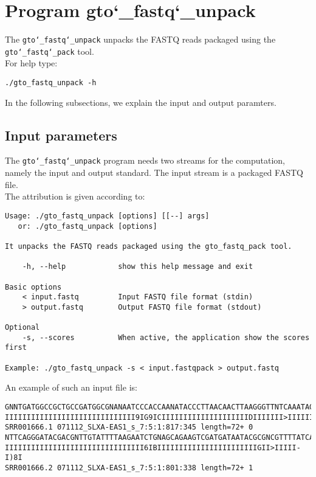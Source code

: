 \section{Program gto\char`_fastq\char`_unpack}
The \texttt{gto\char`_fastq\char`_unpack} unpacks the FASTQ reads packaged using the \texttt{gto\char`_fastq\char`_pack} tool.\\
For help type:
\begin{lstlisting}
./gto_fastq_unpack -h
\end{lstlisting}
In the following subsections, we explain the input and output paramters.

\subsection*{Input parameters}

The \texttt{gto\char`_fastq\char`_unpack} program needs two streams for the computation, namely the input and output standard. The input stream is a packaged FASTQ file.\\
The attribution is given according to:
\begin{lstlisting}
Usage: ./gto_fastq_unpack [options] [[--] args]
   or: ./gto_fastq_unpack [options]

It unpacks the FASTQ reads packaged using the gto_fastq_pack tool.

    -h, --help            show this help message and exit

Basic options
    < input.fastq         Input FASTQ file format (stdin)
    > output.fastq        Output FASTQ file format (stdout)

Optional
    -s, --scores          When active, the application show the scores first
    
Example: ./gto_fastq_unpack -s < input.fastqpack > output.fastq
\end{lstlisting}
An example of such an input file is:
\begin{lstlisting}
GNNTGATGGCCGCTGCCGATGGCGNANAATCCCACCAANATACCCTTAACAACTTAAGGGTTNTCAAATAGA
IIIIIIIIIIIIIIIIIIIIIIIIIIIIII9IG9ICIIIIIIIIIIIIIIIIIIIIDIIIIIII>IIIIII/
SRR001666.1 071112_SLXA-EAS1_s_7:5:1:817:345 length=72+	0
NTTCAGGGATACGACGNTTGTATTTTAAGAATCTGNAGCAGAAGTCGATGATAATACGCGNCGTTTTATCAN
IIIIIIIIIIIIIIIIIIIIIIIIIIIIIIII6IBIIIIIIIIIIIIIIIIIIIIIIIGII>IIIII-I)8I
SRR001666.2 071112_SLXA-EAS1_s_7:5:1:801:338 length=72+ 1
\end{lstlisting}

